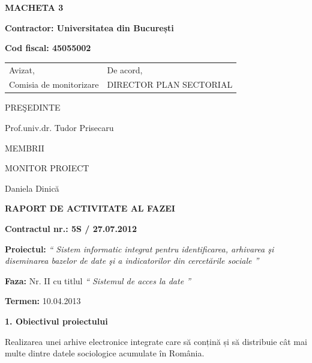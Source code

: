 \documentclass[a4paper]{article}
\title{}
\author{}
\date{2013-04-08}
\begin{document}
{\raggedleft\bfseries
MACHETA 3
\par}

{\bfseries
Contractor: \foreignlanguage{romanian}{Universitatea din Bucure\c{s}ti}}

{\textbf{Cod fiscal: 45055002}


\bigskip


\bigskip


\bigskip


\bigskip

{\bfseries

\begin{tabular}{@{}l l}
Avizat,&De acord,\\
Comisia de monitorizare&DIRECTOR PLAN SECTORIAL\\
\end{tabular}
}

\bigskip

PRE\c{S}EDINTE

Prof.univ.dr. Tudor Prisecaru

\bigskip

MEMBRII

\bigskip

\bigskip

MONITOR PROIECT

Daniela Dinic\u{a}

\bigskip

\bigskip

\bigskip

\bigskip

{\centering\bfseries
RAPORT DE ACTIVITATE AL FAZEI
\par}


\bigskip


\bigskip

{\bfseries
Contractul nr.: 5S / 27.07.2012}

{
\textbf{Proiectul: }
\textit{`` Sistem informatic integrat pentru identificarea, arhivarea \c{s}i diseminarea bazelor de date \c{s}i a indicatorilor din
cercet\u{a}rile sociale ''}}

\bigskip

{
\textbf{Faza: }
Nr. II cu titlul
\textit{`` Sistemul de acces la date ''}}

{\textbf{Termen:} 10.04.2013}

\bigskip
{\bfseries 
1. Obiectivul proiectului}

{
\foreignlanguage{english}{Realizarea }\foreignlanguage{romanian}{unei arhive electronice integrate care s\u{a}
con\c{t}in\u{a} \c{s}i s\u{a} distribuie c\^at mai multe dintre datele sociologice acumulate \^in Rom\^ania.}}

}
\end{document}
